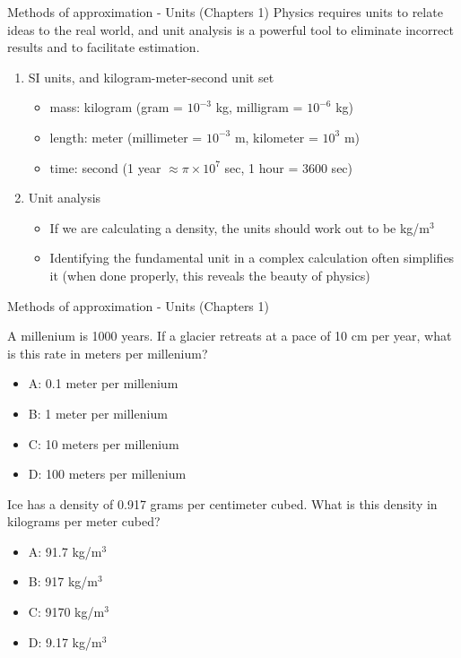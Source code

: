 \documentclass{beamer}
\begin{document}
\begin{frame}{Methods of approximation - Units (Chapters 1)}
Physics requires \alert{units} to relate ideas to the real world, and \alert{unit analysis} is a powerful tool to eliminate incorrect results and to facilitate estimation.
\begin{enumerate}
\item SI units, and kilogram-meter-second unit set
\begin{itemize}
\item mass: \alert{kilogram} (gram = $10^{-3}$ kg, milligram = $10^{-6}$ kg)
\item length: \alert{meter} (millimeter = $10^{-3}$ m, kilometer = $10^{3}$ m)
\item time: \alert{second} (1 year $\approx \pi \times 10^{7}$ sec, 1 hour = 3600 sec)
\end{itemize}
\item Unit analysis
\begin{itemize}
\item If we are calculating a density, the units should work out to be kg/m$^3$
\item Identifying the fundamental unit in a complex calculation often simplifies it (when done properly, this reveals the beauty of physics)
\end{itemize}
\end{enumerate}
\end{frame}

\begin{frame}{Methods of approximation - Units (Chapters 1)}
\small
\begin{minipage}[b]{0.45\linewidth}
A millenium is 1000 years.  If a glacier retreats at a pace of 10 cm per year, what is this rate in meters per millenium?
\vspace{0.2cm}
\begin{itemize}
\item A: 0.1 meter per millenium
\item B: 1 meter per millenium
\item C: 10 meters per millenium
\item D: 100 meters per millenium
\end{itemize}
\end{minipage}
\hspace{0.5cm}
\begin{minipage}[b]{0.45\linewidth}
Ice has a density of 0.917 grams per centimeter cubed.  What is this density in kilograms per meter cubed?
\vspace{1.1cm}
\begin{itemize}
\item A: 91.7 kg/m$^3$
\item B: 917 kg/m$^3$
\item C: 9170 kg/m$^3$
\item D: 9.17 kg/m$^3$
\end{itemize}
\end{minipage}
\end{frame}
\end{document}
